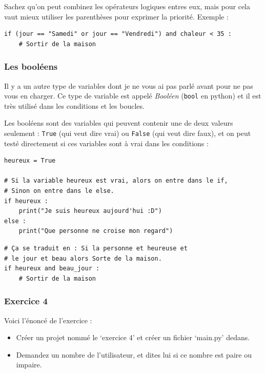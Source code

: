 \documentclass[12pt]{article}
\newcommand{\code}[1]{\colorbox{light-gray}{\texttt{#1}}}
\begin{document}
            Sachez qu'on peut combinez les opérateurs logiques entres eux, mais pour cela vaut mieux 
            utiliser les parenthèses pour exprimer la priorité. Exemple :
            \begin{lstlisting}[style=code]
if (jour == "Samedi" or jour == "Vendredi") and chaleur < 35 :
    # Sortir de la maison
            \end{lstlisting}

        \subsubsection{Les booléens}
            Il y a un autre type de variables dont je ne vous ai pas parlé avant pour ne pas vous en charger. 
            Ce type de variable est appelé \emph{Booléen} (\code{bool} en python) et il est très 
            utilisé dans les conditions et les boucles. 

            Les booléens sont des variables qui peuvent contenir une de deux valeurs seulement : \code{True} 
            (qui veut dire vrai) ou \code{False} (qui veut dire faux), et on peut testé directement si ces 
            variables sont à vrai dans les conditions : 
            \begin{lstlisting}[style=code]
heureux = True

# Si la variable heureux est vrai, alors on entre dans le if,
# Sinon on entre dans le else.
if heureux :
    print("Je suis heureux aujourd'hui :D")
else :
    print("Que personne ne croise mon regard")
            \end{lstlisting}
        
            \begin{lstlisting}[style=code]
# Ça se traduit en : Si la personne et heureuse et 
# le jour et beau alors Sorte de la maison.
if heureux and beau_jour :
    # Sortir de la maison
            \end{lstlisting}

        \subsubsection{Exercice 4}
            Voici l'énoncé de l'exercice :
            \begin{itemize}
                \item Créer un projet nommé le `exercice 4' et créer un fichier `main.py' dedans.
                \item Demandez un nombre de l'utilisateur, et dites lui si ce nombre est paire ou impaire.
            \end{itemize}
\end{document}
